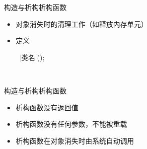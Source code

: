 \begin{frame}[t, fragile]{构造与析构}{析构函数}%
  \begin{itemize}
  \item 对象消失时的\alert{清理工作}（如释放内存单元）
  \item 定义\\
    \begin{center}
      \begin{minipage}{0.5\linewidth}
        \begin{cpptt}
~|类名|();
        \end{cpptt}
      \end{minipage}\\
      \begin{minipage}{0.6\linewidth}
      \end{minipage}
    \end{center}
  \end{itemize}
\end{frame}

\begin{frame}[t, fragile]{构造与析构}{析构函数}%
  \begin{spacing}{1.6}
    \begin{itemize}
    \item 析构函数没有返回值
    \item 析构函数没有任何参数，不能被重载
    \item 析构函数在对象消失时由系统自动调用
    \end{itemize}
  \end{spacing}
  \vspace{-2ex}
    
  \begin{center}
    \begin{minipage}{0.3\linewidth}
    \end{minipage}\qquad\qquad
    \begin{minipage}{0.3\linewidth}
    \end{minipage}
  \end{center}
  
\end{frame}

